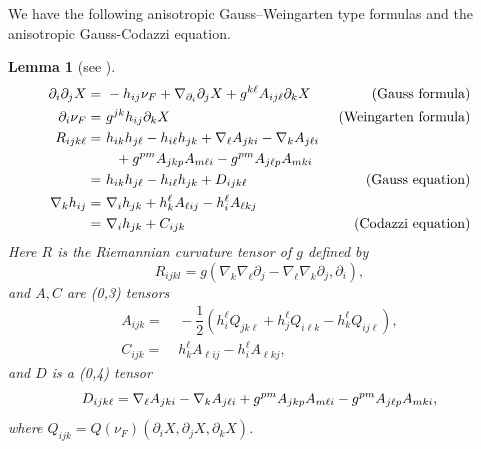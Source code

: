 \documentclass[10pt,a4paper]{amsart}
\newtheorem{lemma}[proposition]{Lemma}
\numberwithin{equation}{section}
\begin{document}
	We have the following anisotropic Gauss--Weingarten type formulas and the anisotropic Gauss-Codazzi equation.
	\begin{lemma}[see {\cite[Lemma 6.7]{Xia12}}]
		\label{lem-formula}
		\begin{align}
			\partial_i\partial_j X = & ~- h_{ij}\nu_F + \nabla_{\partial_i} \partial_j X+ g^{k\ell} A_{ij\ell}\partial_k X \quad &\text{(Gauss formula)} \label{gaussformula}\\
			\partial_i \nu_F = & ~g^{jk}h_{ij}\partial_k X \quad &\text{(Weingarten formula)}   \label{weinformula}\\
			R_{ijk\ell} =&~ h_{ik}h_{j\ell} - h_{i\ell}h_{jk} + \nabla_{\ell}A_{jki}-\nabla_{k}A_{j\ell i}\notag  \\
			&\quad  + g^{pm}A_{jkp}A_{m\ell i} - g^{pm}A_{j\ell p}A_{mki} \notag \\
			=& ~h_{ik}h_{j\ell} - h_{i\ell}h_{jk} + D_{ijk\ell} \quad &\text{(Gauss equation)}  \notag\\
			\nabla_k h_{ij} =& ~\nabla_{i} h_{jk}  + h_k^{\ell} A_{\ell i j} -h_{i}^{\ell} A_{\ell k j} \notag \\
			=&~ \nabla_{i} h_{jk} + C_{ijk} \quad &\text{(Codazzi equation)}  \label{codazziequ}
		\end{align}
		Here $R$ is the Riemannian curvature tensor of $g$ defined by
		\begin{equation*}
			R_{ijkl} =g\left( \nabla_{k}\nabla_{\ell} \partial_j - \nabla_{\ell}\nabla_{k} \partial_j, \partial_i \right),
		\end{equation*}
		and $A , C$   are (0,3) tensors
		\begin{align}
			A_{ijk} = &~-\dfrac{1}{2}\left( h^{\ell}_i Q_{jk\ell} + h^{\ell}_j Q_{i\ell k} - h^{\ell}_k Q_{ij\ell} \right),  \label{Atensor} \\
			C_{ijk}= &~h_k^{\ell} A_{\ell i j} -h_{i}^{\ell} A_{\ell k j},\nonumber
		\end{align}
		and $D$ is a (0,4) tensor
		\begin{equation*}
			D_{ijk\ell}= \nabla_{\ell}A_{jki}-\nabla_{k}A_{j\ell i}\notag
			+ g^{pm}A_{jkp}A_{m\ell i} - g^{pm}A_{j\ell p}A_{mki},
		\end{equation*}
		where $Q_{ijk}=Q(\nu_F)(\partial_i X, \partial_j X, \partial_k X)$.
	\end{lemma}
\end{document}
